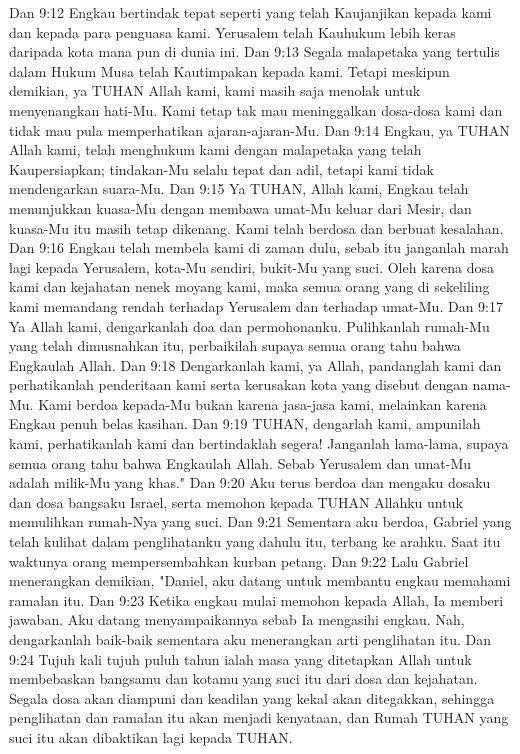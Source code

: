 Dan 9:12  Engkau bertindak tepat seperti yang telah Kaujanjikan kepada kami dan kepada para penguasa kami. Yerusalem telah Kauhukum lebih keras daripada kota mana pun di dunia ini.
Dan 9:13  Segala malapetaka yang tertulis dalam Hukum Musa telah Kautimpakan kepada kami. Tetapi meskipun demikian, ya TUHAN Allah kami, kami masih saja menolak untuk menyenangkan hati-Mu. Kami tetap tak mau meninggalkan dosa-dosa kami dan tidak mau pula memperhatikan ajaran-ajaran-Mu.
Dan 9:14  Engkau, ya TUHAN Allah kami, telah menghukum kami dengan malapetaka yang telah Kaupersiapkan; tindakan-Mu selalu tepat dan adil, tetapi kami tidak mendengarkan suara-Mu.
Dan 9:15  Ya TUHAN, Allah kami, Engkau telah menunjukkan kuasa-Mu dengan membawa umat-Mu keluar dari Mesir, dan kuasa-Mu itu masih tetap dikenang. Kami telah berdosa dan berbuat kesalahan.
Dan 9:16  Engkau telah membela kami di zaman dulu, sebab itu janganlah marah lagi kepada Yerusalem, kota-Mu sendiri, bukit-Mu yang suci. Oleh karena dosa kami dan kejahatan nenek moyang kami, maka semua orang yang di sekeliling kami memandang rendah terhadap Yerusalem dan terhadap umat-Mu.
Dan 9:17  Ya Allah kami, dengarkanlah doa dan permohonanku. Pulihkanlah rumah-Mu yang telah dimusnahkan itu, perbaikilah supaya semua orang tahu bahwa Engkaulah Allah.
Dan 9:18  Dengarkanlah kami, ya Allah, pandanglah kami dan perhatikanlah penderitaan kami serta kerusakan kota yang disebut dengan nama-Mu. Kami berdoa kepada-Mu bukan karena jasa-jasa kami, melainkan karena Engkau penuh belas kasihan.
Dan 9:19  TUHAN, dengarlah kami, ampunilah kami, perhatikanlah kami dan bertindaklah segera! Janganlah lama-lama, supaya semua orang tahu bahwa Engkaulah Allah. Sebab Yerusalem dan umat-Mu adalah milik-Mu yang khas."
Dan 9:20  Aku terus berdoa dan mengaku dosaku dan dosa bangsaku Israel, serta memohon kepada TUHAN Allahku untuk memulihkan rumah-Nya yang suci.
Dan 9:21  Sementara aku berdoa, Gabriel yang telah kulihat dalam penglihatanku yang dahulu itu, terbang ke arahku. Saat itu waktunya orang mempersembahkan kurban petang.
Dan 9:22  Lalu Gabriel menerangkan demikian, "Daniel, aku datang untuk membantu engkau memahami ramalan itu.
Dan 9:23  Ketika engkau mulai memohon kepada Allah, Ia memberi jawaban. Aku datang menyampaikannya sebab Ia mengasihi engkau. Nah, dengarkanlah baik-baik sementara aku menerangkan arti penglihatan itu.
Dan 9:24  Tujuh kali tujuh puluh tahun ialah masa yang ditetapkan Allah untuk membebaskan bangsamu dan kotamu yang suci itu dari dosa dan kejahatan. Segala dosa akan diampuni dan keadilan yang kekal akan ditegakkan, sehingga penglihatan dan ramalan itu akan menjadi kenyataan, dan Rumah TUHAN yang suci itu akan dibaktikan lagi kepada TUHAN.
